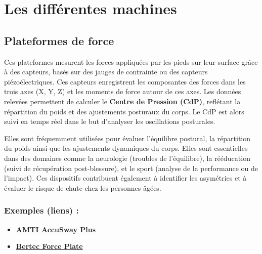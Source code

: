 \section{Les différentes machines}

\subsection{Plateformes de force}

Ces plateformes mesurent les forces appliquées par les pieds sur leur surface grâce à des capteurs, basés sur des jauges de contrainte ou des capteurs piézoélectriques. 
Ces capteurs enregistrent les composantes des forces dans les trois axes (X, Y, Z) et les moments de force autour de ces axes. 
Les données relevées permettent de calculer le \textbf{Centre de Pression (CdP)}, reflétant la répartition du poids et des ajustements posturaux du corps. 
Le CdP est alors suivi en temps réel dans le but d'analyser les oscillations posturales.

Elles sont fréquemment utilisées pour évaluer l’équilibre postural, la répartition du poids ainsi que les ajustements dynamiques du corps. 
Elles sont essentielles dans des domaines comme la neurologie (troubles de l’équilibre), la rééducation (suivi de récupération post-blessure), et le sport (analyse de la performance ou de l’impact). 
Ces dispositifs contribuent également à identifier les asymétries et à évaluer le risque de chute chez les personnes âgées.

\subsubsection{Exemples (liens) :}
\begin{itemize}
  \item \href{https://www.amti.biz/product-line/force-plates/}{\textbf{AMTI AccuSway Plus}}
  \item \href{https://www.bertec.com/products/force-plates}{\textbf{Bertec Force Plate}}
\end{itemize}

